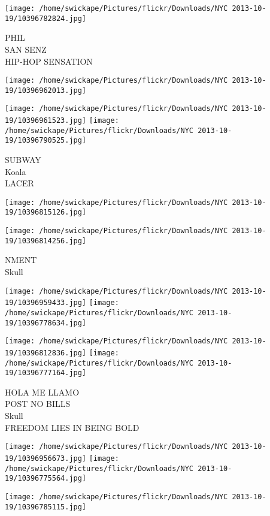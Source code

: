 \documentclass[10pt,letterpaper]{article}
\begin{document}
\texttt{[image: /home/swickape/Pictures/flickr/Downloads/NYC 2013-10-19/10396782824.jpg]}

PHIL\\
SAN SENZ\\
HIP{-}HOP SENSATION\\
\pagebreak

\texttt{[image: /home/swickape/Pictures/flickr/Downloads/NYC 2013-10-19/10396962013.jpg]}

\vspace{0.25in}
\texttt{[image: /home/swickape/Pictures/flickr/Downloads/NYC 2013-10-19/10396961523.jpg]}
\texttt{[image: /home/swickape/Pictures/flickr/Downloads/NYC 2013-10-19/10396790525.jpg]}

SUBWAY\\
Koala\\
LACER\\
\pagebreak

\texttt{[image: /home/swickape/Pictures/flickr/Downloads/NYC 2013-10-19/10396815126.jpg]}

\vspace{0.25in}
\texttt{[image: /home/swickape/Pictures/flickr/Downloads/NYC 2013-10-19/10396814256.jpg]}

NMENT\\
Skull\\
\pagebreak

\texttt{[image: /home/swickape/Pictures/flickr/Downloads/NYC 2013-10-19/10396959433.jpg]}
\texttt{[image: /home/swickape/Pictures/flickr/Downloads/NYC 2013-10-19/10396778634.jpg]}

\texttt{[image: /home/swickape/Pictures/flickr/Downloads/NYC 2013-10-19/10396812836.jpg]}
\texttt{[image: /home/swickape/Pictures/flickr/Downloads/NYC 2013-10-19/10396777164.jpg]}

HOLA ME LLAMO\\
POST NO BILLS\\
Skull\\
FREEDOM LIES IN BEING BOLD\\
\pagebreak

\texttt{[image: /home/swickape/Pictures/flickr/Downloads/NYC 2013-10-19/10396956673.jpg]}
\texttt{[image: /home/swickape/Pictures/flickr/Downloads/NYC 2013-10-19/10396775564.jpg]}

\vspace{0.25in}
\texttt{[image: /home/swickape/Pictures/flickr/Downloads/NYC 2013-10-19/10396785115.jpg]}
\end{document}
